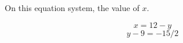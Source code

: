 \documentclass[12pt, a5paper]{article}
\begin{document}
On this equation system, the value of $x$.

$$
x = 12 - y
$$
$$
y - 9 = -15 / 2
$$
\end{document}
